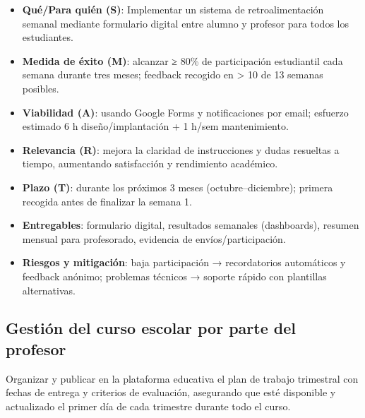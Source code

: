 \documentclass[
  spanish,
  11pt,
]{report}
\providecommand{\tightlist}{%
  \setlength{\itemsep}{0pt}\setlength{\parskip}{0pt}}
\begin{document}
\begin{itemize}
\tightlist
\item
  \textbf{Qué/Para quién (S)}: Implementar un sistema de
  retroalimentación semanal mediante formulario digital entre alumno y
  profesor para todos los estudiantes.
\item
  \textbf{Medida de éxito (M)}: alcanzar ≥ 80\% de participación
  estudiantil cada semana durante tres meses; feedback recogido en
  \textgreater{} 10 de 13 semanas posibles.
\item
  \textbf{Viabilidad (A)}: usando Google Forms y notificaciones por
  email; esfuerzo estimado 6 h diseño/implantación + 1 h/sem
  mantenimiento.
\item
  \textbf{Relevancia (R)}: mejora la claridad de instrucciones y dudas
  resueltas a tiempo, aumentando satisfacción y rendimiento académico.
\item
  \textbf{Plazo (T)}: durante los próximos 3 meses (octubre--diciembre);
  primera recogida antes de finalizar la semana 1.
\item
  \textbf{Entregables}: formulario digital, resultados semanales
  (dashboards), resumen mensual para profesorado, evidencia de
  envíos/participación.
\item
  \textbf{Riesgos y mitigación}: baja participación → recordatorios
  automáticos y feedback anónimo; problemas técnicos → soporte rápido
  con plantillas alternativas.
\end{itemize}

\subsection{Gestión del curso escolar por parte del
profesor}\label{gestiuxf3n-del-curso-escolar-por-parte-del-profesor}

Organizar y publicar en la plataforma educativa el plan de trabajo
trimestral con fechas de entrega y criterios de evaluación, asegurando
que esté disponible y actualizado el primer día de cada trimestre
durante todo el curso.
\end{document}
